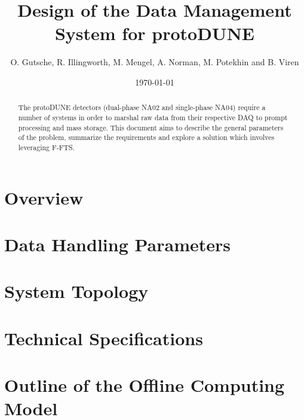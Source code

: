 \documentclass[pdftex,12pt,letter]{article}
\title{Design of the Data Management System for protoDUNE}
\date{\today}
\author{O. Gutsche, R. Illingworth, M. Mengel, A. Norman, M. Potekhin and B. Viren}
\begin{document}
\maketitle

\begin{abstract}
The protoDUNE detectors (dual-phase NA02 and single-phase NA04)
require a number of systems in order to marshal raw data from
their respective DAQ to prompt processing and mass storage.  This
document aims to  describe the general parameters of the problem, summarize the requirements
and explore a solution which involves leveraging F-FTS.
\end{abstract}

\tableofcontents

\pagebreak

\section{Overview}



\section{Data Handling Parameters}


\section{System Topology}


\section{Technical Specifications}


\section{Outline of the Offline Computing Model}

\end{document}

